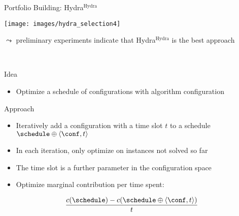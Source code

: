 \begin{frame}[c]{\hydra{} Portfolio Building: Hydra$^{\text{Hydra}}$}

\texttt{[image: images/hydra\_selection4]}

\bigskip
\pause
$\leadsto$ preliminary experiments indicate that Hydra$^{\text{Hydra}}$ is the best approach

\end{frame}
\begin{frame}[c]{\cedalion~}

\begin{block}{Idea}
\begin{itemize}
  \item Optimize a schedule of configurations with algorithm configuration 
\end{itemize}
\end{block}

\medskip
\pause

\begin{block}{Approach}
\begin{itemize}
  \item Iteratively add a configuration with a time slot $t$ to a schedule $\schedule \oplus \langle\conf,t\rangle$
  \pause
  \item In each iteration, only optimize on instances not solved so far
  \item The time slot is a further parameter in the configuration space
  \pause
  \item Optimize marginal contribution per time spent: 
\end{itemize}

\begin{equation}
\frac{c(\schedule) - c(\schedule \oplus \langle\conf,t\rangle)}{t} \nonumber
\end{equation}
\end{block}

\end{frame}
